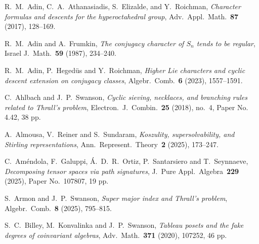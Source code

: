 \documentclass[12pt]%
{amsart}
\def\red#1{{\color{red}{#1}}}
\def\magenta#1{{\color{magenta}{#1}}}
\theoremstyle{plain}
\theoremstyle{definition}
\theoremstyle{remark}
\begin{document}
\begin{thebibliography}{}
    
    R.\ M.\ Adin, C.\ A.\ Athanasiadis, S.\ Elizalde, and Y.\ Roichman,
    {\em Character formulas and descents for the hyperoctahedral group},
    Adv.\ Appl.\ Math.~{\bf 87} (2017), 128--169.


    R.\ M.\ Adin and A.\ Frumkin,
    {\em The conjugacy character of  $S_n$  tends to be regular}, 
    Israel J.\ Math.~{\bf 59} (1987), 234--240.

    R.\ M.\ Adin, P.\ Heged\"{u}s and Y.\ Roichman, 
    {\em Higher Lie characters and cyclic descent extension on conjugacy classes}, 
    Algebr.\ Comb.~{\bf 6} (2023), 1557--1591.


    C.\ Ahlbach and J.\ P.\ Swanson,
    {\em Cyclic sieving, necklaces, and branching rules related to Thrall's problem}, 
    Electron.\ J.\ Combin.~{\bf 25} (2018), no.\ 4, Paper No. 4.42, 38 pp.  

    A.\ Almousa, V.\ Reiner and S.\ Sundaram, 
    {\em Koszulity, supersolvability, and Stirling representations}, 
    Ann.\ Represent.\ Theory~{\bf 2} (2025), 173--247.


    C.\ Am\'endola, F.\ Galuppi, \'A.\ D.\ R.\ Ortiz, P.\  Santarsiero and T.\ Seynnaeve, 
    {\em Decomposing tensor spaces via path signatures}, 
    J.\ Pure Appl.\ Algebra~{\bf 229} (2025), Paper No.~107807, 19 pp.

    S.\ Armon and J.\ P.\ Swanson, 
    {\em Super major index and Thrall's problem}, 
    Algebr.\ Comb.~{\bf 8} (2025), 795--815.


    S.\ C.\ Billey, M.\ Konvalinka and J.\ P.\ Swanson, 
    {\em Tableau posets and the fake degrees of coinvariant algebras}, 
    Adv.\ Math.~{\bf 371} (2020), 107252, 46 pp.


\end{thebibliography}
\end{document}
